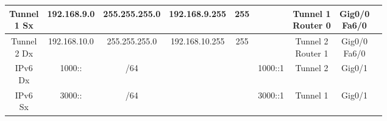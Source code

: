 \begin{tabular}{|c|c|c|c|c|c|c|c|c|}
    \hline
    \Centerstack{Tunnel\\1 Sx} & 192.168.9.0 & 255.255.255.0 & 192.168.9.255 &  255 & & \Centerstack{Tunnel 1\\Router 0} & \Centerstack{Gig0/0\\Fa6/0}\\
    \hline
    \Centerstack{Tunnel\\2 Dx} & 192.168.10.0 & 255.255.255.0 & 192.168.10.255 &  255 & & \Centerstack{Tunnel 2\\Router 1} & \Centerstack{Gig0/0\\Fa6/0}\\
    \hline
    \Centerstack{IPv6\\Dx} & 1000:: & /64 & & & 1000::1 & Tunnel 2 & Gig0/1\\
    \hline
    \Centerstack{IPv6\\Sx} & 3000:: & /64 & & & 3000::1 & Tunnel 1 & Gig0/1\\
    \hline

\end{tabular}
